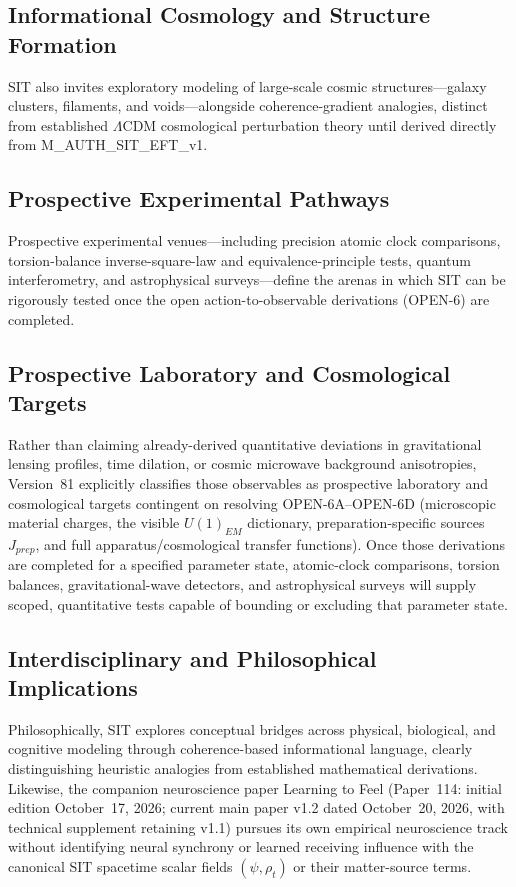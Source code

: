 \documentclass[american,11pt,letterpaper]{article}
\def\mathrm#1{#1}%
\def\texttt#1{#1}%
\def\emph#1{#1}%
\begin{document}
\subsection{Informational Cosmology and Structure Formation}

SIT also invites exploratory modeling of large-scale cosmic structures---galaxy clusters, filaments, and voids---alongside coherence-gradient analogies, distinct from established $\Lambda$CDM cosmological perturbation theory until derived directly from \texttt{M\_AUTH\_SIT\_EFT\_v1}.

\subsection{Prospective Experimental Pathways}

Prospective experimental venues---including precision atomic clock comparisons, torsion-balance inverse-square-law and equivalence-principle tests, quantum interferometry, and astrophysical surveys---define the arenas in which SIT can be rigorously tested once the open action-to-observable derivations (\texttt{OPEN-6}) are completed.

\subsection{Prospective Laboratory and Cosmological Targets}

Rather than claiming already-derived quantitative deviations in gravitational lensing profiles, time dilation, or cosmic microwave background anisotropies, Version~81 explicitly classifies those observables as \emph{prospective laboratory and cosmological targets} contingent on resolving \texttt{OPEN-6A}--\texttt{OPEN-6D} (microscopic material charges, the visible $U(1)_{\mathrm{EM}}$ dictionary, preparation-specific sources $J_{\mathrm{prep}}$, and full apparatus/cosmological transfer functions). Once those derivations are completed for a specified parameter state, atomic-clock comparisons, torsion balances, gravitational-wave detectors, and astrophysical surveys will supply scoped, quantitative tests capable of bounding or excluding that parameter state.

\subsection{Interdisciplinary and Philosophical Implications}

Philosophically, SIT explores conceptual bridges across physical, biological, and cognitive modeling through coherence-based informational language, clearly distinguishing heuristic analogies from established mathematical derivations. Likewise, the companion neuroscience paper \emph{Learning to Feel} (Paper~114: initial edition October~17, 2026; current main paper v1.2 dated October~20, 2026, with technical supplement retaining v1.1) pursues its own empirical neuroscience track without identifying neural synchrony or learned receiving influence with the canonical SIT spacetime scalar fields $(\psi, \rho_t)$ or their matter-source terms.
\end{document}
